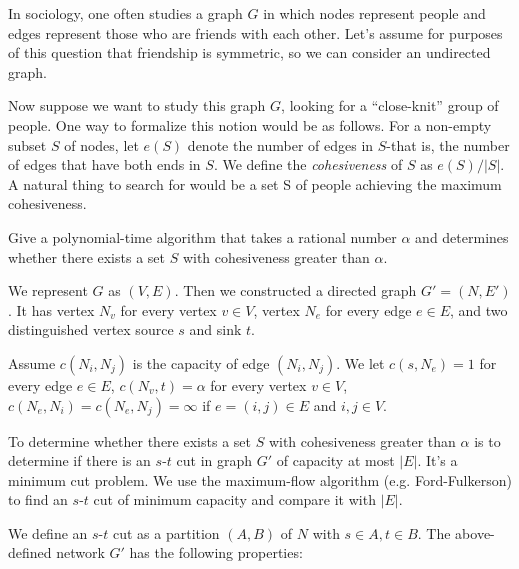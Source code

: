 \newpage
{} %

\problemdes

In sociology, one often studies a graph $G$ in which nodes represent people and edges represent those who are friends with each other. Let’s assume for purposes of this question that friendship is symmetric, so we can consider an undirected graph.

Now suppose we want to study this graph $G$, looking for a “close-knit” group of people. One way to formalize this notion would be as follows. For a non-empty subset $S$ of nodes, let $e(S)$ denote the number of edges in $S$-that is, the number of edges that have both ends in $S$. We define the \textit{cohesiveness} of $S$ as $e(S)/|S|$. A natural thing to search for would be a set S of people achieving the maximum cohesiveness.


Give a polynomial-time algorithm that takes a rational number $\alpha$ and determines whether there exists a set $S$ with cohesiveness greater than $\alpha$.

\solution


We represent $G$ as $(V, E)$. Then we constructed a directed graph $G'=(N, E')$. It has vertex $N_v$ for every vertex $v\in V$, vertex $N_e$ for every edge $e\in E$, and two distinguished vertex source $s$ and sink $t$. 

Assume $c(N_i, N_j)$ is the capacity of edge $(N_i, N_j)$. We let $c(s, N_e)=1$ for every edge $e\in E$, $c(N_v, t)=\alpha$ for every vertex $v\in V$, $c(N_e, N_i)=c(N_e, N_j)=\infty$ if $e=(i, j)\in E$ and $i,j\in V$. 

To determine whether there exists a set $S$ with cohesiveness greater than $\alpha$ is to determine if there is an $s$-$t$ cut in graph $G'$ of capacity at most $|E|$. It's a minimum cut problem. We use the maximum-flow algorithm (e.g. Ford-Fulkerson) to find an $s$-$t$ cut of minimum capacity and compare it with $|E|$.



We define an $s$-$t$ cut as a partition $(A, B)$ of $N$ with $s \in A, t \in B$. The above-defined network $G'$ has the following properties:

